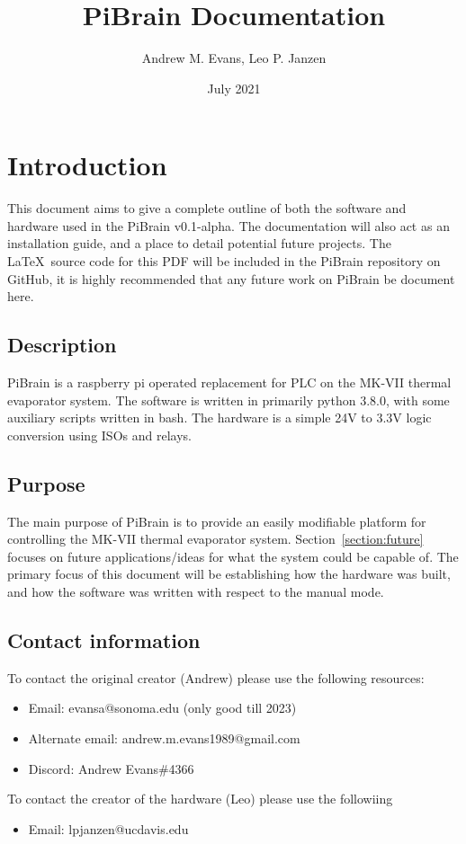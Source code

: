 \documentclass{article}
\title{PiBrain Documentation}
\author{Andrew M. Evans, Leo P. Janzen}
\date{July 2021}
\begin{document}
\maketitle

\tableofcontents

\section{Introduction}
This document aims to give a complete outline of both the software and hardware used in the PiBrain v0.1-alpha. The documentation will also act as an installation guide, and a place to detail potential future projects. The \LaTeX\ source code for this PDF will be included in the PiBrain repository on GitHub, it is highly recommended that any future work on PiBrain be document here.\\

\subsection{Description}
PiBrain is a raspberry pi operated replacement for PLC on the MK-VII thermal evaporator system. The software is written in primarily python 3.8.0, with some auxiliary scripts written in bash. The hardware is a simple 24V to 3.3V logic conversion using ISOs and relays.\\

\subsection{Purpose}
The main purpose of PiBrain is to provide an easily modifiable platform for controlling the MK-VII thermal evaporator system. Section~\ref{section:future} focuses on future applications/ideas for what the system could be capable of. The primary focus of this document will be establishing how the hardware was built, and how the software was written with respect to the manual mode.
\subsection{Contact information}

To contact the original creator (Andrew) please use the following resources:
\begin{itemize}
    \item Email: evansa@sonoma.edu (only good till 2023)
    \item Alternate email: andrew.m.evans1989@gmail.com
    \item Discord: Andrew Evans\#4366
\end{itemize}
To contact the creator of the hardware (Leo) please use the followiing 
\begin{itemize}
    \item Email: lpjanzen@ucdavis.edu
\end{itemize}
\end{document}
